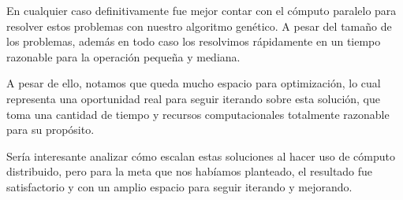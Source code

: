\documentclass[main.tex]{subfiles}
\begin{document}
En cualquier caso definitivamente fue mejor contar con el cómputo paralelo para
resolver estos problemas con nuestro algoritmo genético. A pesar del tamaño de
los problemas, además en todo caso los resolvimos rápidamente en un tiempo
razonable para la operación pequeña y mediana.

A pesar de ello, notamos que queda mucho espacio para optimización, lo cual
representa una oportunidad real para seguir iterando sobre esta solución, que
toma una cantidad de tiempo y recursos computacionales totalmente razonable
para su propósito.

Sería interesante analizar cómo escalan estas soluciones al hacer uso de
cómputo distribuido, pero para la meta que nos habíamos planteado, el resultado
fue satisfactorio y con un amplio espacio para seguir iterando y mejorando.
\end{document}
